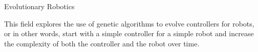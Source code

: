 

Evolutionary Robotics

This field explores the use of genetic algorithms to evolve controllers for robots, or in other words, start with a simple controller for a simple robot and increase the complexity of both the controller and the robot over time. 

